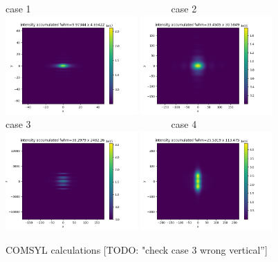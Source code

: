 \documentclass{iucr}              %
\newcommand{\todo}[1]{{\color{red}[TODO: "#1'']}}
\begin{document}
\begin{figure}\label{fig:comsyl}
    \centering
    case 1~~~~~~~~~~~~~~~~~~~~~~~~~~~~~case 2\\
    \includegraphics[width=0.45\textwidth]{figures/case1_comsyl.png}
    \includegraphics[width=0.45\textwidth]{figures/case2_comsyl.png}\\
    case 3~~~~~~~~~~~~~~~~~~~~~~~~~~~~~case 4\\
    \includegraphics[width=0.45\textwidth]{figures/case3_comsyl.png}
    \includegraphics[width=0.45\textwidth]{figures/case4_comsyl.png}
    \caption{COMSYL calculations \todo{check case 3 wrong vertical}}
\end{figure}
\end{document}
